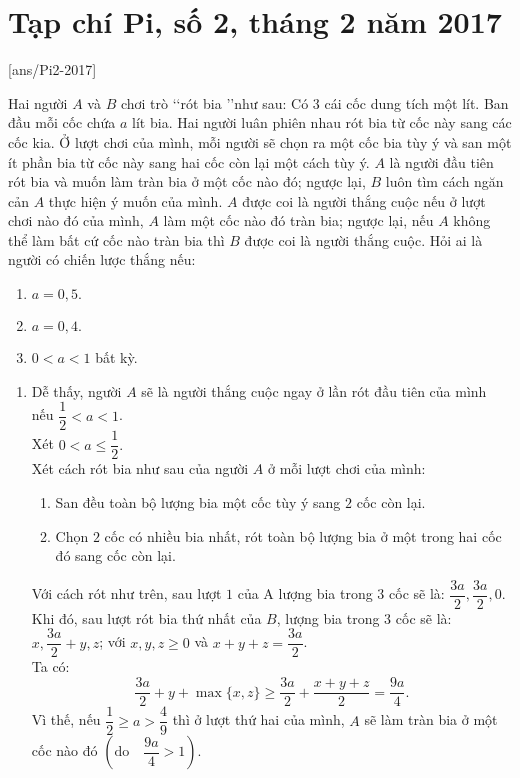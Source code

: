 \section{Tạp chí Pi, số 2,  tháng 2 năm 2017}
[ans/Pi2-2017]

\begin{bt}%
Hai người $A$ và $B$ chơi trò \lq\lq rót bia \rq\rq như sau: Có $3$ cái cốc dung tích một lít. Ban đầu mỗi cốc chứa $a$ lít bia. Hai người luân phiên nhau rót bia từ cốc này sang các cốc kia. Ở lượt chơi của mình, mỗi người sẽ chọn ra một cốc bia tùy ý và san một ít phần bia từ cốc này sang hai cốc còn lại một cách tùy ý. $A$ là người đầu tiên rót bia và muốn làm tràn bia ở một cốc nào đó; ngược lại, $B$ luôn tìm cách ngăn cản $A$ thực hiện ý muốn của mình. $A$ được coi là người thắng cuộc nếu ở lượt chơi nào đó của mình, $A$ làm một cốc nào đó tràn bia; ngược lại, nếu $A$ không thể làm bất cứ cốc nào tràn bia thì $B$ được coi là người thắng cuộc. Hỏi ai là người có chiến lược thắng nếu:
\begin{enumerate}
\item $a=0{,}5.$	
\item $a=0{,}4.$
\item $0<a<1$ bất kỳ.
\end{enumerate}
\loigiai
{
\begin{enumerate}[$\bullet$]
\item Dễ thấy, người $A$ sẽ là người thắng cuộc ngay ở lần rót đầu tiên của mình nếu $\dfrac{1}{2}<a<1$.\\
Xét $0<a\leq\dfrac{1}{2}.$\\
Xét cách rót bia như sau của người $A$ ở mỗi lượt chơi của mình:
\begin{enumerate}[- Lượt 1:]
\item San đều toàn bộ lượng bia một cốc tùy ý sang $2$ cốc còn lại.
\item Chọn $2$ cốc có nhiều bia nhất, rót toàn bộ lượng bia ở một trong hai cốc đó sang cốc còn lại.
\end{enumerate}
Với cách rót như trên, sau lượt $1$ của A lượng bia trong $3$ cốc sẽ là: $\dfrac{3a}{2}, \dfrac{3a}{2}, 0$.
Khi đó, sau lượt rót bia thứ nhất của  $B$, lượng bia trong $3$ cốc sẽ là: $x, \dfrac{3a}{2}+y, z$; với $x, y, z\geq 0$ và $x+y+z=\dfrac{3a}{2}$.\\
Ta có:
$$\dfrac{3a}{2}+y+\max\{x, z\}\geq\dfrac{3a}{2}+\dfrac{x+y+z}{2}=\dfrac{9a}{4}.$$
Vì thế, nếu $\dfrac{1}{2}\geq a>\dfrac{4}{9}$ thì ở lượt thứ hai của mình, $A$ sẽ làm tràn bia ở một cốc nào đó $\left(\text{do}\quad \dfrac{9a}{4}>1\right)$.

\end{enumerate}}
\end{bt}
